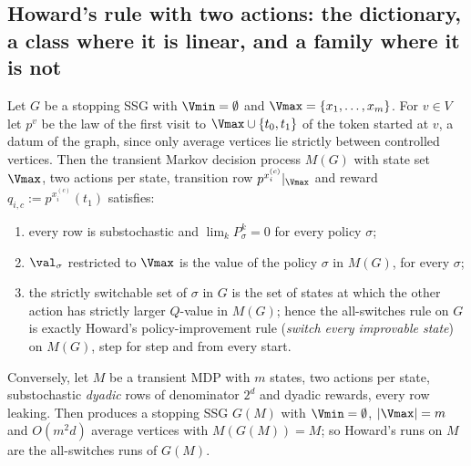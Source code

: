 
\subsection{Howard's rule with two actions: the dictionary, a class where it is
linear, and a family where it is not}\label{sec:oph}

\begin{proposition}\label{oph:dictionary}
Let $G$ be a stopping SSG with $\Vmin=\emptyset$ and $\Vmax=\{x_1,\dots,x_m\}$. For
$v\in V$ let $p^{v}$ be the law of the first visit to $\Vmax\cup\{t_0,t_1\}$ of the
token started at $v$, a datum of the graph, since only average vertices lie strictly
between controlled vertices. Then the transient Markov decision process
$M(G)$ with state set $\Vmax$, two actions per state, transition row
$p^{x_i^{(c)}}|_{\Vmax}$ and reward $q_{i,c}:=p^{x_i^{(c)}}(t_1)$ satisfies:
\begin{enumerate}[label=(\alph*),leftmargin=2.2em]
\item every row is substochastic and $\lim_kP_\sigma^k=0$ for every policy $\sigma$;
\item $\val_\sigma$ restricted to $\Vmax$ is the value of the policy $\sigma$ in
      $M(G)$, for every $\sigma$;
\item the strictly switchable set of $\sigma$ in $G$ is the set of states at which
      the other action has strictly larger $Q$-value in $M(G)$; hence the
      all-switches rule on $G$ is exactly Howard's policy-improvement rule
      (\emph{switch every improvable state}) on $M(G)$, step for step and from every
      start.
\end{enumerate}
Conversely, let $M$ be a transient MDP with $m$ states, two actions per state,
substochastic \emph{dyadic} rows of denominator $2^{d}$ and dyadic rewards, every
row leaking. Then  produces a stopping SSG $G(M)$ with
$\Vmin=\emptyset$, $|\Vmax|=m$ and $O(m^{2}d)$ average vertices with
$M(G(M))=M$; so Howard's runs on $M$ are the all-switches runs of $G(M)$.
\end{proposition}

